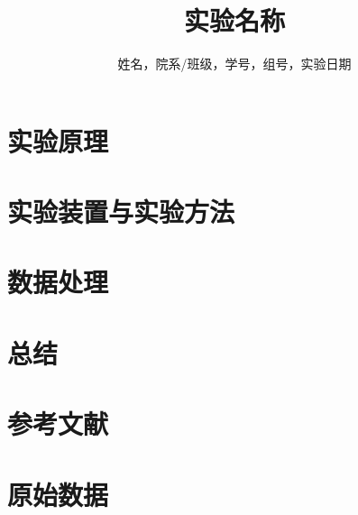 \documentclass[12pt,a4paper]{ctexart}
\title{实验名称}
\author{姓名，院系/班级，学号，组号，实验日期}
\date{}
\begin{document}
\maketitle

\begin{abstract}
\end{abstract}

\section{实验原理}


\section{实验装置与实验方法}


\section{数据处理}



\section{总结}


\section{参考文献}


\section{原始数据}

\end{document}
